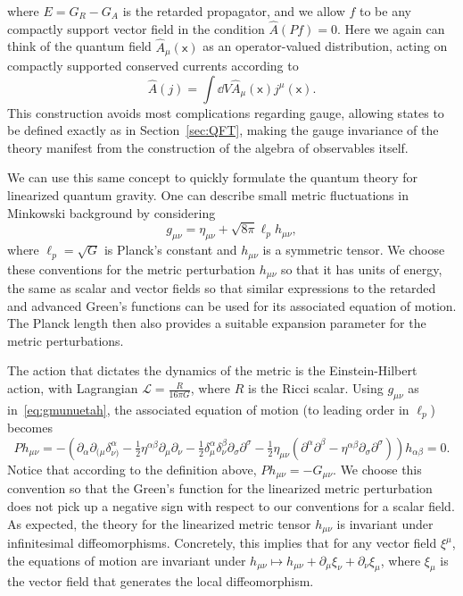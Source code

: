 \documentclass[letterpaper,12pt,titlepage,oneside,final]{book}
\newcommand{\mf}{\mathsf}%
\begin{document}
\noindent where $E = G_R - G_A$ is the retarded propagator, and we allow $f$ to be any compactly support vector field in the condition $\hat{A}(Pf) = 0$. Here we again can think of the quantum field $\hat{A}_\mu(\mf x)$ as an operator-valued distribution, acting on compactly supported conserved currents according to
\begin{equation}
    \hat{A}(j) = \int \dd V \hat{A}_\mu(\mf x) j^\mu(\mf x).
\end{equation}
This construction avoids most complications regarding gauge, allowing states to be defined exactly as in Section~\ref{sec:QFT}, making the gauge invariance of the theory manifest from the construction of the algebra of observables itself.

We can use this same concept to quickly formulate the quantum theory for linearized quantum gravity. One can describe small metric fluctuations in Minkowski background by considering
\begin{equation}\label{eq:gmunuetah}
    g_{\mu\nu} = \eta_{\mu\nu} + \sqrt{8\pi}\ell_p h_{\mu\nu},
\end{equation}
where $\ell_p = \sqrt{G}$ is Planck's constant and $h_{\mu\nu}$ is a symmetric tensor. We choose these conventions for the metric perturbation $h_{\mu\nu}$ so that it has units of energy, the same as scalar and vector fields so that similar expressions to the retarded and advanced Green's functions can be used for its associated equation of motion. The Planck length then also provides a suitable expansion parameter for the metric perturbations.

The action that dictates the dynamics of the metric is the Einstein-Hilbert action, with Lagrangian $\mathcal{L} = \frac{R}{16\pi G}$, where $R$ is the Ricci scalar. Using $g_{\mu\nu}$ as in~\eqref{eq:gmunuetah}, the associated equation of motion (to leading order in $\ell_p$) becomes
\begin{equation}\label{eq:Gmunulin}
    Ph_{\mu\nu} = -\left(\partial_\alpha \partial_{(\mu} \delta^\alpha_{\nu)} - \tfrac{1}{2} \eta^{\alpha\beta}\partial_\mu \partial_\nu - \tfrac{1}{2}\delta^\alpha_\mu \delta^\beta_\nu  \partial_\sigma \partial^\sigma  - \tfrac{1}{2}\eta_{\mu\nu}(\partial^\alpha \partial^\beta - \eta^{\alpha\beta} \partial_\sigma \partial^\sigma) \right) h_{\alpha\beta} = 0.
\end{equation}
Notice that according to the definition above, $Ph_{\mu\nu} = -G_{\mu\nu}$. We choose this convention so that the Green's function for the linearized metric perturbation does not pick up a negative sign with respect to our conventions for a scalar field. As expected, the theory for the linearized metric tensor $h_{\mu\nu}$ is invariant under infinitesimal diffeomorphisms. Concretely, this implies that for any vector field $\xi^\mu$, the equations of motion are invariant under $h_{\mu\nu} \mapsto h_{\mu\nu} + \partial_\mu \xi_\nu + \partial_\nu \xi_\mu$, where $\xi_\mu$ is the vector field that generates the local diffeomorphism. 
\end{document}

